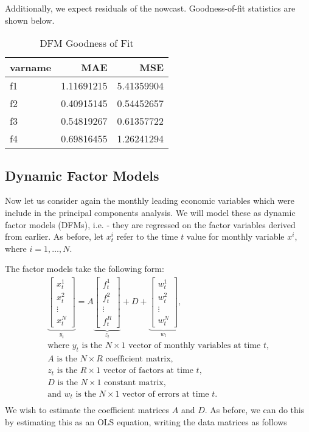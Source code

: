 \documentclass[11pt, letterpaper]{article}\usepackage[]{graphicx}\usepackage[]{color}
\begin{document}
Additionally, we expect residuals of the nowcast. Goodness-of-fit statistics are shown below.
\begin{table}[H]
\centering
\begingroup\footnotesize
\begin{tabular}{lrr}
  \hline
varname & MAE & MSE \\ 
  \hline
f1 & 1.11691215 & 5.41359904 \\ 
  f2 & 0.40915145 & 0.54452657 \\ 
  f3 & 0.54819267 & 0.61357722 \\ 
  f4 & 0.69816455 & 1.26241294 \\ 
   \hline
\end{tabular}
\endgroup
\caption{DFM Goodness of Fit} 
\end{table}




\subsection{Dynamic Factor Models}
Now let us consider again the monthly leading economic variables which were include in the principal components analysis. We will model these as dynamic factor models (DFMs), i.e. - they are regressed on the factor variables derived from earlier. As before, let $x^i_t$ refer to the time $t$ value for monthly variable $x^i$, where $i = 1, \dots, N$.

The factor models take the following form:
\begin{align*}
\underbrace{\begin{bmatrix}
	x^1_t\\
	x^2_t\\
	\vdots \\
	x^N_t
\end{bmatrix}}_{y_t}
=
A
\underbrace{\begin{bmatrix}
	f^1_{t}\\
	f^2_{t}\\
	\vdots \\
	f^R_{t}
\end{bmatrix}}_{z_t}
+
D 
+
\underbrace{\begin{bmatrix}
	w^1_t\\
	w^2_t\\
	\vdots\\
	w^N_t
\end{bmatrix}}_{w_t},\\
\text{where $y_t$ is the $N \times 1$ vector of monthly variables at time $t$,}\\
\text{$A$ is the $N \times R$ coefficient matrix,}\\
\text{$z_t$ is the $R \times 1$ vector of factors at time $t$,}\\
\text{$D$ is the $N \times 1$ constant matrix,}\\
\text{and $w_t$ is the $N \times 1$ vector of errors at time $t$.}\\
\end{align*}
We wish to estimate the coefficient matrices $A$ and $D$. As before, we can do this by estimating this as an OLS equation, writing the data matrices as follows
\end{document}
